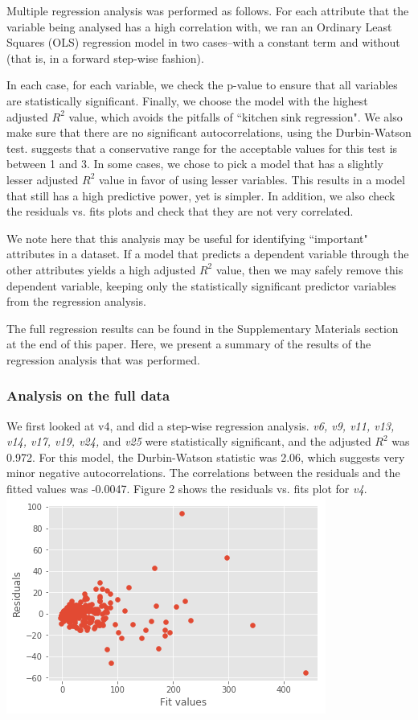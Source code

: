 \documentclass[12pt,a4paper,twocolumn]{article}
\begin{document}
	Multiple regression analysis was performed as follows. For each attribute that the variable being analysed has a high correlation with, we ran an Ordinary Least Squares (OLS) regression model in two cases--with a constant term and without (that is, in a forward step-wise fashion). 
	
	In each case, for each variable, we check the p-value to ensure that all variables are statistically significant. Finally, we choose the model with the highest adjusted $R^2$ value, which avoids the pitfalls of ``kitchen sink regression". We also make sure that there are no significant autocorrelations, using the Durbin-Watson test. \cite{field2009discovering} suggests that a conservative range for the acceptable values for this test is between 1 and 3. In some cases, we chose to pick a model that has a slightly lesser adjusted $R^2$ value in favor of using lesser variables. This results in a model that still has a high predictive power, yet is simpler. In addition, we also check the residuals vs. fits plots and check that they are not very correlated. 
	
	We note here that this analysis may be useful for identifying ``important" attributes in a dataset. If a model that predicts a dependent variable through the other attributes yields a high adjusted $R^2$ value, then we may safely remove this dependent variable, keeping only the statistically significant predictor variables from the regression analysis.
	
	The full regression results can be found in the Supplementary Materials section at the end of this paper. Here, we present a summary of the results of the regression analysis that was performed.
	
	\subsubsection{Analysis on the full data}
	We first looked at v4, and did a step-wise regression analysis. \textit{v6, v9, v11, v13, v14, v17, v19, v24,} and \textit{v25} were statistically significant, and the adjusted $R^2$ was 0.972. For this model, the Durbin-Watson statistic was 2.06, which suggests very minor negative autocorrelations. The correlations between the residuals and the fitted values was -0.0047. Figure 2 shows the residuals vs. fits plot for \textit{v4}.\\
	
	\includegraphics[scale=0.5]{fig2.png}
	\begingroup
	\endgroup
	\hfill\break
	
\end{document}
